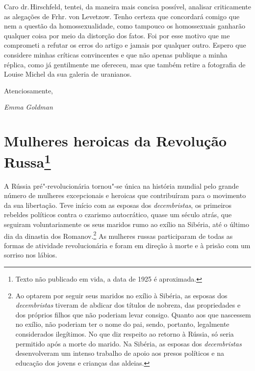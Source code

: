 Caro dr.\,Hirschfeld, tentei, da maneira mais concisa possível, analisar
criticamente as alegações de Frhr. von Levetzow. Tenho certeza que
concordará comigo que nem a questão da homossexualidade, como tampouco
os homossexuais ganharão qualquer coisa por meio da distorção dos fatos.
Foi por esse motivo que me comprometi a refutar os erros do artigo e
jamais por qualquer outro. Espero que considere minhas críticas
convincentes e que não apenas publique a minha réplica, como já
gentilmente me ofereceu, mas que também retire a fotografia de Louise
Michel da sua galeria de uranianos.

\medskip

Atenciosamente,

\smallskip

\textit{Emma Goldman}




\chapter{Mulheres heroicas da Revolução Russa\footnote{Texto não publicado em
  vida, a data de 1925 é aproximada.}}

A Rússia pré"-revolucionária tornou"-se única na história mundial pelo
grande número de mulheres excepcionais e heroicas que contribuíram para
o movimento da sua libertação. Teve início com as esposas dos
\textit{decembristas}, os primeiros rebeldes políticos contra o czarismo
autocrático, quase um século atrás, que seguiram voluntariamente os
seus maridos rumo ao exílio na Sibéria, até o último dia da dinastia dos
Romanov.\footnote{Ao optarem por seguir seus maridos no exílio à
  Sibéria, as esposas dos \textit{decembristas} tiveram de abdicar dos títulos de
  nobreza, das propriedades e dos próprios filhos que não poderiam levar consigo. Quanto aos que nascessem no exílio, não poderiam ter o nome do
  pai, sendo, portanto, legalmente considerados ilegítimos. No que diz respeito ao retorno à Rússia, só seria permitido
  após a morte do marido. Na Sibéria, as esposas dos \textit{decembristas} desenvolveram um intenso trabalho de apoio aos presos políticos e na educação dos jovens e crianças das
  aldeias.} As mulheres russas participaram de todas as formas de
atividade revolucionária e foram em direção à morte e à prisão com um
sorriso nos lábios.


